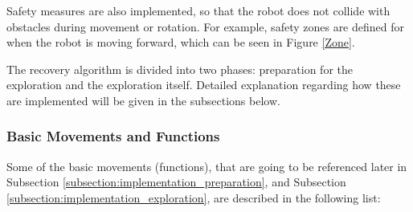 Safety measures are also implemented, so that the robot does not collide with obstacles during movement or rotation. For example, safety zones are defined for when the robot is moving forward, which can be seen in Figure \ref{Zone}.

The recovery algorithm is divided into two phases: preparation for the exploration and the exploration itself. Detailed explanation regarding how these are implemented will be given in the subsections below.

\subsubsection{Basic Movements and Functions}
Some of the basic movements (functions), that are going to be referenced later in Subsection \ref{subsection:implementation_preparation}, and Subsection \ref{subsection:implementation_exploration}, are described in the following list:





